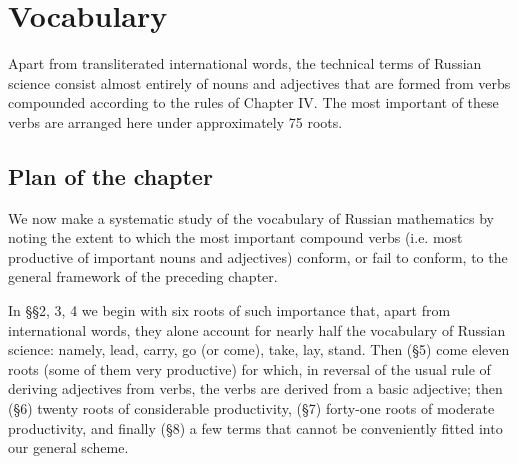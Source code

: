 \chapter{Vocabulary}
\sloppy

\begin{sourcebox}
Apart from transliterated international words, the technical terms of Russian science consist almost entirely of nouns and adjectives that are formed from verbs compounded according to the rules of Chapter IV. The most important of these verbs are arranged here under approximately 75 roots.
\end{sourcebox}

\section{Plan of the chapter}

We now make a systematic study of the vocabulary of Russian mathematics by noting the extent to which the most important compound verbs (i.e. most productive of important nouns and adjectives) conform, or fail to conform, to the general framework of the preceding chapter.

In §§2, 3, 4 we begin with six roots of such importance that, apart from international words, they alone account for nearly half the vocabulary of Russian science: namely,  lead,  carry,  go (or come),  take,  lay,  stand. Then (§5) come eleven roots (some of them very productive) for which, in reversal of the usual rule of deriving adjectives from verbs, the verbs are derived from a basic adjective; then (§6) twenty roots of considerable productivity, (§7) forty-one roots of moderate productivity, and finally (§8) a few terms that cannot be conveniently fitted into our general scheme.

